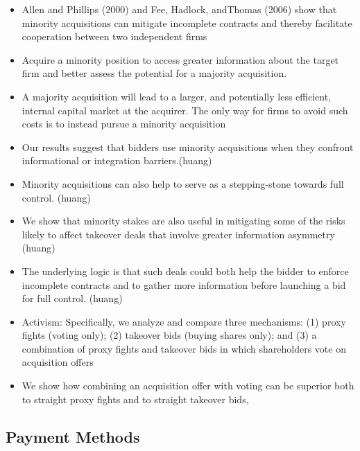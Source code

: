 \documentclass[12pt]{article}
\begin{document}
\begin{itemize}
        \item Allen and Phillips (2000) and Fee, Hadlock, andThomas (2006) show that minority acquisitions can mitigate incomplete contracts and thereby facilitate cooperation between two independent firms \citep{Ouimet2013}

        \item Acquire a minority position to access greater information about the target firm and better assess the potential for a majority acquisition. \citep{Ouimet2013}

        \item A majority acquisition will lead to a larger, and potentially less efficient, internal capital market at the acquirer. The only way for firms to avoid such costs is to instead pursue a minority acquisition \citep{Ouimet2013}

        \item Our results suggest that bidders use minority acquisitions when they confront informational or integration barriers.(huang)

        \item Minority acquisitions can also help to serve as a stepping-stone towards full control. (huang)

        \item We show that minority stakes are also useful in mitigating some of the risks likely to affect takeover deals that involve greater information asymmetry (huang)

        \item The underlying logic is that such deals could both help the bidder to enforce incomplete contracts and to gather more information before launching a bid for full control. (huang)

        \item Activism: Specifically, we analyze and compare three mechanisms: (1) proxy fights (voting only); (2) takeover bids (buying shares only); and (3) a combination of proxy fights and takeover bids in which shareholders vote on acquisition offers \citep{Arlen2001}

        \item We show how combining an acquisition offer with voting can be superior both to straight proxy fights and to straight takeover bids, \citep{Arlen2001}
    \end{itemize}

\subsection{Payment Methods}
\end{document}
